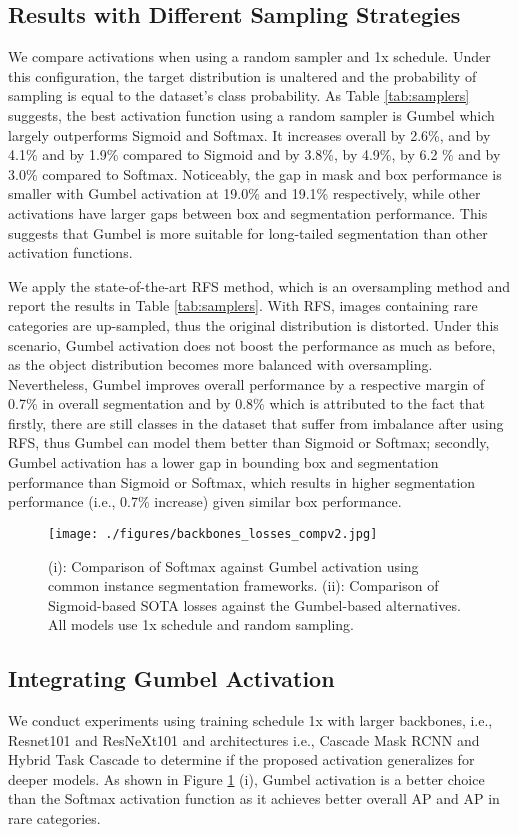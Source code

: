 \documentclass[runningheads]{llncs}
\begin{document}
\subsection{Results with Different Sampling Strategies}
We compare activations when using a random sampler and 1x schedule. Under this configuration, the target distribution is unaltered and the probability of sampling is equal to the dataset's class probability.
As Table \ref{tab:samplers} suggests, the best activation function using a random sampler is Gumbel which largely outperforms Sigmoid and Softmax. It increases overall  by 2.6\%,  and  by 4.1\% and   by 1.9\% compared to Sigmoid and  by 3.8\%,  by 4.9\%,  by 6.2 \% and  by 3.0\% compared to Softmax. Noticeably, the gap in mask and box performance is smaller with Gumbel activation at 19.0\% and 19.1\% respectively, while other activations have larger gaps between box and segmentation performance. This suggests that Gumbel is more suitable for long-tailed segmentation than other activation functions.

We apply the state-of-the-art RFS \cite{gupta2019lvis} method, which is an oversampling method and report the results in Table \ref{tab:samplers}. With RFS, images containing rare categories are up-sampled, thus the original distribution is distorted. Under this scenario, Gumbel activation does not boost the performance as much as before, as the object distribution becomes more balanced with oversampling. Nevertheless, Gumbel improves overall performance by a respective margin of 0.7\% in overall segmentation and by 0.8\%  which is attributed to the fact that firstly, there are still classes in the dataset that suffer from imbalance after using RFS, thus Gumbel can model them better than Sigmoid or Softmax; secondly, Gumbel activation has a lower gap in bounding box and segmentation performance than Sigmoid or Softmax, which results in higher segmentation performance (i.e., 0.7\% increase) given similar box performance.
\begin{figure}[t]
    \centering
    \texttt{[image: ./figures/backbones\_losses\_compv2.jpg]}
    \caption{(i): Comparison of Softmax against Gumbel activation using common instance segmentation frameworks. (ii): Comparison of Sigmoid-based SOTA losses against the Gumbel-based alternatives. All models use 1x schedule and random sampling.}
    \label{fig:backbones_losses}
\end{figure}

\subsection{Integrating Gumbel Activation}
We conduct experiments using training schedule 1x with larger backbones, i.e., Resnet101 \cite{he2016deep} and ResNeXt101 \cite{xie2017aggregated} and architectures i.e., Cascade Mask RCNN \cite{cai2019cascade} and Hybrid Task Cascade \cite{chen2019hybrid} to determine if the proposed activation generalizes for deeper models. As shown in Figure \ref{fig:backbones_losses} (i), Gumbel activation is a better choice than the Softmax activation function as it achieves better overall AP and AP in rare categories. 
\end{document}
